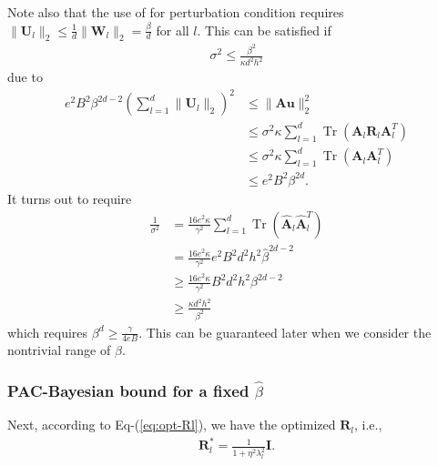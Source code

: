 \documentclass[journal]{IEEEtran} %
\def\eqref#1{Eq-(\ref{#1})}
\def\vu{{\bm{u}}}
\def\mA{{\bm{A}}}
\def\mI{{\bm{I}}}
\def\mR{{\bm{R}}}
\def\mU{{\bm{U}}}
\def\mW{{\bm{W}}}
\newcommand{\Norm}[1]{\|#1\|}
\DeclareMathOperator{\Tr}{Tr}
\begin{document}
Note also that the use of \cite[Lemma~2]{neyshabur2018pac} for perturbation condition requires $\Norm{\mU_l}_2 \le \frac{1}{d}\Norm{\mW_l}_2 = \frac{\beta}{d}$ for all $l$. This can be satisfied if
\begin{align}
    \sigma^2 \le \frac{\beta^2}{\kappa d^2 h^2}
\end{align}
due to
\begin{align}
    e^2 B^2 \beta^{2d-2} \left( \sum_{l=1}^d\Norm{\mU_l}_2\right)^2 &\le \Norm{\mA \vu}_2^2 \\
    &\le \sigma^2 \kappa \sum_{l=1}^d \Tr(\mA_l \mR_l \mA_l^T)\\
    & \le \sigma^2 \kappa \sum_{l=1}^d \Tr(\mA_l \mA_l^T)\\
    & \le e^2 B^2 \beta^{2d}.
\end{align}
It turns out to require 
\begin{align}
    \frac{1}{{\sigma}^2} &= \frac{16e^2 \kappa}{\gamma^2} \sum_{l=1}^d \Tr(\hat{\mA}_l  \hat{\mA}_l^T) \\
    & =  \frac{16e^2 \kappa}{\gamma^2} e^2 B^2 d^2 h^2 \hat{\beta}^{2d-2} \\
    & \ge \frac{16e^2 \kappa}{\gamma^2} B^2 d^2 h^2 {\beta}^{2d-2} \\
    &\ge \frac{\kappa d^2 h^2}{ \beta^2}
\end{align}
which requires $\beta^d \ge \frac{\gamma}{4eB}$. This can be guaranteed later when we consider the nontrivial range of $\beta$.



\subsubsection{PAC-Bayesian bound for a fixed $\hat{\beta}$}
Next, according to \eqref{eq:opt-Rl}, we have the optimized $\mR_l$, i.e.,
\begin{align} \label{eq:diagonal-Rl}
    {\mR}_l^* = \frac{1}{1+{\eta}^2 {\lambda}_l^2} \mI.
\end{align}
\end{document}
